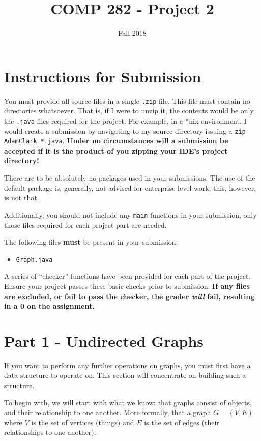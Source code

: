 \documentclass{article}
\begin{document}
\title{COMP 282 - Project 2}
\author{}
\date{Fall 2018}
\maketitle

\section*{Instructions for Submission}

You must provide all source files in a single \texttt{.zip} file.  This file
must contain no directories whatsoever.  That is, if I were to unzip it, the
contents would be only the \texttt{.java} files required for the project.  For
example, in a *nix environment, I would create a submission by navigating to my
source directory issuing a \texttt{zip AdamClark *.java}.  {\bf Under no
circumstances will a submission be accepted if it is the product of you zipping
your IDE's project directory!}

There are to be absolutely no packages used in your submissions.  The use of
the default package is, generally, not advised for enterprise-level work; this,
however, is not that.

Additionally, you should not include any \texttt{main} functions in your
submission, only those files required for each project part are needed.

The following files {\bf must} be present in your submission:

\begin{itemize}
\item \texttt{Graph.java}
\end{itemize}

A series of ``checker'' functions have been provided for each part of the
project.  Ensure your project passes these basic checks prior to submission.
{\bf If any files are excluded, or fail to pass the checker, the grader {\em
will} fail, resulting in a 0 on the assignment.}

\section*{Part 1 - Undirected Graphs}

If you want to perform any further operations on graphs, you must first have a
data structure to operate on.  This section will concentrate on building such a
structure.

To begin with, we will start with what we know: that graphs consist of objects,
and their relationship to one another.  More formally, that a graph $G = (V,
E)$ where $V$ is the set of vertices (things) and $E$ is the set of edges
(their relationships to one another).
\end{document}
